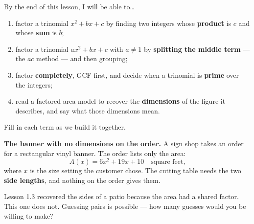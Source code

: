 \documentclass[10pt]{article}
\begin{document}

\vspace{0.15in}

\begin{objectivebox}
\small
By the end of this lesson, I will be able to\dots
\begin{enumerate}[leftmargin=1.5em, itemsep=2pt, topsep=3pt]
  \item factor a trinomial $x^2+bx+c$ by finding two integers whose \textbf{product} is $c$ and
        whose \textbf{sum} is $b$;
  \item factor a trinomial $ax^2+bx+c$ with $a \ne 1$ by \textbf{splitting the middle term} --- the
        $ac$ method --- and then grouping;
  \item factor \textbf{completely}, GCF first, and decide when a trinomial is \textbf{prime} over
        the integers;
  \item read a factored area model to recover the \textbf{dimensions} of the figure it describes,
        and say what those dimensions mean.
\end{enumerate}
\end{objectivebox}

\vspace{0.10in}

\boxguard
\begin{vocabbox}
\small
Fill in each term as we build it together.
\end{vocabbox}

\vspace{0.10in}

\boxguard[12]
\begin{hookbox}
\small
\textbf{The banner with no dimensions on the order.} A sign shop takes an order for a rectangular
vinyl banner. The order lists only the area:
\[ A(x) = 6x^2+19x+10 \quad \text{square feet,} \]
where $x$ is the size setting the customer chose. The cutting table needs the two \textbf{side
lengths}, and nothing on the order gives them.

Lesson 1.3 recovered the sides of a patio because the area had a shared factor. This one does not.
Guessing pairs is possible --- how many guesses would you be willing to make?

\end{hookbox}
\end{document}
